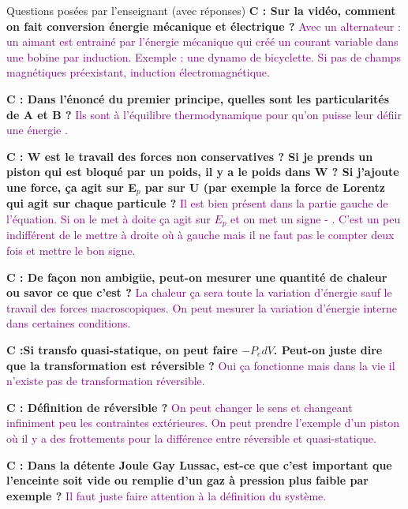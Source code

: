 \begin{reportBlock}{Questions posées par l’enseignant (avec réponses)}
  \textbf{C : Sur la vidéo, comment on fait conversion énergie mécanique et électrique ?}  \textcolor{purple}{Avec un alternateur : un aimant est entrainé par l'énergie mécanique qui créé un courant variable dans une bobine par induction. Exemple : une dynamo de bicyclette. Si pas de champs magnétiques préexistant, induction électromagnétique.} \newline
  
  \textbf{C : Dans l'énoncé du premier principe, quelles sont les particularités de A et B ?}  \textcolor{purple}{Ils sont à l'équilibre thermodynamique pour qu'on puisse leur défiir une énergie .} \newline
  
  \textbf{C : W est le travail des forces non conservatives ? Si je prends un piston qui est bloqué par un poids, il y a le poids dans W ? Si j'ajoute une force, ça agit sur E$_p$ par sur U (par exemple la force de Lorentz qui agit sur chaque particule ?}  \textcolor{purple}{Il est bien présent dans la partie gauche de l'équation. Si on le met à doite ça agit sur $E_p$ et on met un signe \og - \fg. C'est un peu indifférent de le mettre à droite où à gauche mais il ne faut pas le compter deux fois et mettre le bon signe. } \newline
  
  \textbf{C : De façon non ambigüe, peut-on mesurer une quantité de chaleur ou savor ce que c'est ?}  \textcolor{purple}{La chaleur ça sera toute la variation d'énergie sauf le travail des forces macroscopiques. On peut mesurer la variation d'énergie interne dans certaines conditions.} \newline
  
  \textbf{C :Si transfo quasi-statique, on peut faire $-P_edV$. Peut-on juste dire que la transformation est réversible ?}  \textcolor{purple}{Oui ça fonctionne mais dans la vie il n'existe pas de transformation réversible.} \newline
  
  \textbf{C : Définition de réversible ?}  \textcolor{purple}{On peut changer le sens et changeant infiniment peu les contraintes extérieures. On peut prendre l'exemple d'un piston où il y a des frottements pour la différence entre réversible et quasi-statique.} \newline
  
  \textbf{C : Dans la détente Joule Gay Lussac, est-ce que c'est important que l'enceinte soit vide ou remplie d'un gaz à pression plus faible par exemple ?}  \textcolor{purple}{Il faut juste faire attention à la définition du système. } \newline
  

\end{reportBlock}

